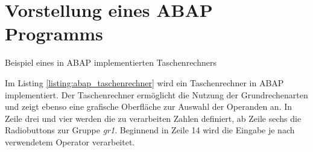 \section{Vorstellung eines ABAP Programms}

\begin{listing}[ht]{}
    \caption{Beispiel eines in ABAP implementierten Taschenrechners}
    \label{listing:abap_taschenrechner}
\end{listing}

Im Listing \ref{listing:abap_taschenrechner} wird ein Taschenrechner in ABAP implementiert. Der Taschenrechner ermöglicht die Nutzung der Grundrechenarten und zeigt ebenso eine grafische Oberfläche zur Auswahl der Operanden an. In Zeile drei und vier werden die zu verarbeiten Zahlen definiert, ab Zeile sechs die Radiobuttons zur Gruppe \textit{gr1}. Beginnend in Zeile 14 wird die Eingabe je nach verwendetem Operator verarbeitet.
\newpage